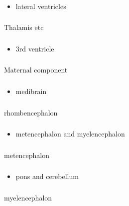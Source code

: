 \documentclass[11pt]{beamer}
\begin{document}
\begin{frame}
 \frametitle{}
\begin{itemize}
\item{lateral ventricles}
\end{itemize}
\end{frame}

\begin{frame}
 \frametitle{}
Thalamis etc 
\end{frame}

\begin{frame}
 \frametitle{}
\begin{itemize}
\item{3rd ventricle}
\end{itemize}
\end{frame}

\begin{frame}
 \frametitle{}
Maternal component
\end{frame}

\begin{frame}
 \frametitle{}
\begin{itemize}
\item{medibrain}
\end{itemize}
\end{frame}

\begin{frame}
 \frametitle{}
rhombencephalon 
\end{frame}

\begin{frame}
 \frametitle{}
\begin{itemize}
\item{metencephalon and myelencephalon }
\end{itemize}
\end{frame}

\begin{frame}
 \frametitle{}
metencephalon 
\end{frame}

\begin{frame}
 \frametitle{}
\begin{itemize}
\item{pons and cerebellum }
\end{itemize}
\end{frame}

\begin{frame}
 \frametitle{}
myelencephalon
\end{frame}
\end{document}
